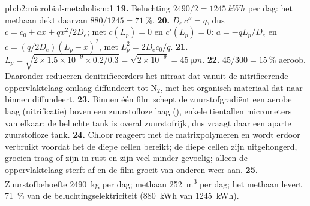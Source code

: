 \begin{solution}{pb:b2:microbial-metabolism:1}
\textbf{19.} Beluchting $2490/2 = \qty{1245}{kWh}$ per dag: het methaan
dekt daarvan $880/1245 = \qty{71}{\%}$.
\textbf{20.} $D_e\,c'' = q$, dus $c = c_0 + ax + qx^2/2D_e$; met
$c(L_p) = 0$ en $c'(L_p) = 0$: $a = -qL_p/D_e$ en $c =
(q/2D_e)(L_p - x)^2$, met $L_p^2 = 2D_ec_0/q$.
\textbf{21.} $L_p = \sqrt{2\times 1.5\times 10^{-9}\times 0.2/0.3} =
\sqrt{2\times 10^{-9}} = \qty{45}{\micro m}$.
\textbf{22.} $45/300 = \qty{15}{\%}$ aeroob. Daaronder reduceren
denitrificeerders het nitraat dat vanuit de nitrificerende oppervlaktelaag
omlaag diffundeert tot $\mathrm{N_2}$, met het organisch materiaal dat
naar binnen diffundeert.
\textbf{23.} Binnen één film schept de zuurstofgradiënt een aerobe laag
(nitrificatie) boven een zuurstofloze laag (), enkele
tientallen micrometers van elkaar; de beluchte tank is overal zuurstofrijk,
dus vraagt  daar een aparte zuurstofloze tank.
\textbf{24.} Chloor reageert met de matrixpolymeren en wordt erdoor
verbruikt voordat het de diepe cellen bereikt; de diepe cellen zijn
uitgehongerd, groeien traag of zijn in rust en zijn veel minder gevoelig;
alleen de oppervlaktelaag sterft af en de film groeit van onderen weer aan.
\textbf{25.} Zuurstofbehoefte \qty{2490}{kg} per dag; methaan
\qty{252}{m^3} per dag; het methaan levert \qty{71}{\%} van de
beluchtingselektriciteit (\qty{880}{kWh} van \qty{1245}{kWh}).
\end{solution}
